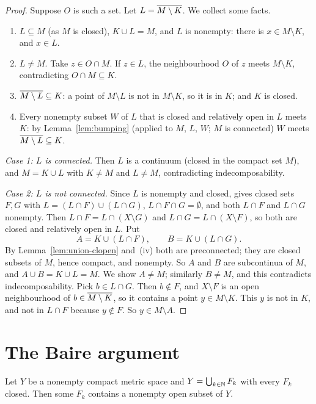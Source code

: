 \begin{proof}
Suppose $O$ is such a set. Let $L=\overline{M\setminus K}$. We collect some facts.
\begin{enumerate}[label=(\roman*)]
\item $L\subseteq M$ (as $M$ is closed), $K\cup L=M$, and $L$ is nonempty: there is $x\in
M\setminus K$, and $x\in L$.
\item $L\neq M$. Take $z\in O\cap M$. If $z\in L$, the neighbourhood $O$ of $z$ meets $M\setminus K$,
contradicting $O\cap M\subseteq K$.
\item $\overline{M\setminus L}\subseteq K$: a point of $M\setminus L$ is not in $M\setminus K$, so it is
in $K$; and $K$ is closed.
\item Every nonempty subset $W$ of $L$ that is closed and relatively open in $L$ meets $K$: by
Lemma~\ref{lem:bumping} (applied to $M$, $L$, $W$; $M$ is connected) $W$ meets $\overline{M\setminus
L}\subseteq K$.
\end{enumerate}
\emph{Case 1: $L$ is connected.} Then $L$ is a continuum (closed in the compact set $M$), and
$M=K\cup L$ with $K\ne M$ and $L\neq M$, contradicting indecomposability.

\emph{Case 2: $L$ is not connected.} Since $L$ is nonempty and closed,  gives closed sets
$F,G$ with $L=(L\cap F)\cup(L\cap G)$, $L\cap F\cap G=\emptyset$, and both $L\cap F$ and $L\cap G$
nonempty. Then $L\cap F=L\cap(X\setminus G)$ and $L\cap G=L\cap(X\setminus F)$, so both are closed and
relatively open in $L$. Put
\[
A=K\cup(L\cap F),\qquad B=K\cup(L\cap G).
\]
By Lemma~\ref{lem:union-clopen} and~(iv) both are preconnected; they are closed subsets of $M$,
hence compact, and nonempty. So $A$ and $B$ are subcontinua of $M$, and $A\cup B=K\cup L=M$. We show
$A\neq M$; similarly $B\neq M$, and this contradicts indecomposability. Pick $b\in L\cap G$. Then
$b\notin F$, and $X\setminus F$ is an open neighbourhood of $b\in\overline{M\setminus K}$, so it contains a
point $y\in M\setminus K$. This $y$ is not in $K$, and not in $L\cap F$ because $y\notin F$. So
$y\in M\setminus A$.
\end{proof}


\section{The Baire argument}\label{sec:baire}

\begin{lemma}\label{lem:baire}
Let $Y$ be a nonempty compact metric space and $Y=\bigcup_{k\in\mathbb{N}}F_k$ with every $F_k$ closed.
Then some $F_k$ contains a nonempty open subset of $Y$.
\end{lemma}

